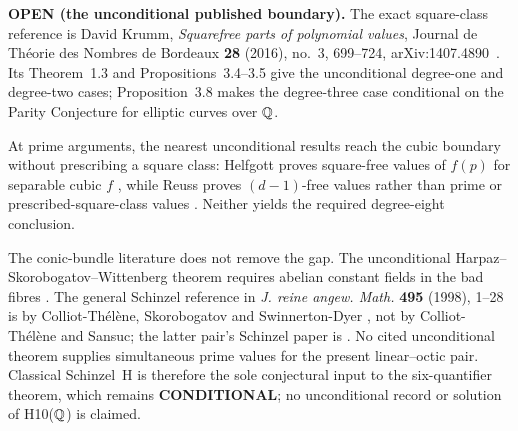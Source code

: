 \textbf{OPEN (the unconditional published boundary).}  The exact
square-class reference is David Krumm, \emph{Squarefree parts of polynomial
values}, Journal de Th\'eorie des Nombres de Bordeaux \textbf{28} (2016),
no.~3, 699--724, arXiv:1407.4890~\cite{krumm}.  Its Theorem~1.3 and
Propositions~3.4--3.5 give the unconditional degree-one and degree-two
cases; Proposition~3.8 makes the degree-three case conditional on the
Parity Conjecture for elliptic curves over $\mathbb{Q}$.

At prime arguments, the nearest unconditional results reach the cubic
boundary without prescribing a square class: Helfgott proves square-free
values of $f(p)$ for separable cubic $f$ \cite{helfgott}, while Reuss
proves $(d-1)$-free values rather than prime or prescribed-square-class
values \cite{reuss}.  Neither yields the required degree-eight
conclusion.

The conic-bundle literature does not remove the gap.  The unconditional
Harpaz--Skorobogatov--Wittenberg theorem requires abelian constant fields
in the bad fibres \cite[Theorem~3.1 and Corollary~3.4]{hsw}.  The general
Schinzel reference in \emph{J. reine angew. Math.} \textbf{495} (1998),
1--28 is by Colliot-Th\'el\`ene, Skorobogatov and Swinnerton-Dyer
\cite{ctssd}, not by Colliot-Th\'el\`ene and Sansuc; the latter pair's
Schinzel paper is \cite{ctsansuc}.  No cited unconditional theorem supplies
simultaneous prime values for the present linear--octic pair.  Classical
Schinzel~H is therefore the sole conjectural input to the six-quantifier
theorem, which remains \textbf{CONDITIONAL}; no unconditional record or
solution of H10($\mathbb{Q}$) is claimed.
